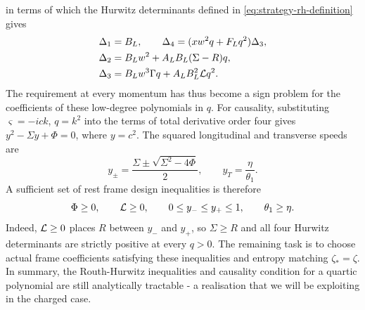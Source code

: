 in terms of which the Hurwitz determinants defined in \eqref{eq:strategy-rh-definition} gives
\begin{align}\label{eq:rh}
 \Delta_1&=B_L,\qquad
 \Delta_4=(xw^2q+F_Lq^2)\Delta_3,\nonumber\\
 \Delta_2&=B_Lw^2+A_LB_L(\Sigma-R)q,\nonumber\\
 \Delta_3&=B_Lw^3\Gamma q+A_LB_L^2\mathcal L q^2.
\end{align}
The requirement at every momentum has thus become a sign problem for
the coefficients of these low-degree polynomials in $q$.
For causality, substituting $\varsigma=-ick$, $q=k^2$ into the terms of
total derivative order four gives $y^2-\Sigma y+\Phi=0$, where
$y=c^2$. The squared longitudinal and transverse speeds are
\begin{equation}\label{eq:speeds}
 y_\pm=\frac{\Sigma\pm\sqrt{\Sigma^2-4\Phi}}2,
 \qquad y_T=\frac{\eta}{\theta_1}.
\end{equation}
A sufficient set of rest frame design inequalities is therefore
\begin{equation}\label{eq:certificate}
 \Phi\geq0,\qquad \mathcal L\geq0,\qquad
 0\leq y_-\leq y_+\leq1,\qquad \theta_1\geq\eta.
\end{equation}
Indeed, $\mathcal L\geq0$ places $R$ between $y_-$ and $y_+$, so
$\Sigma\geq R$ and all four Hurwitz determinants are strictly
positive at every $q>0$. The remaining task is to choose actual
frame coefficients satisfying these inequalities and entropy matching $\zeta_*=\zeta$. In summary, the Routh-Hurwitz inequalities and causality condition for a quartic polynomial are still analytically tractable - a realisation that we will be exploiting in the charged case. 

